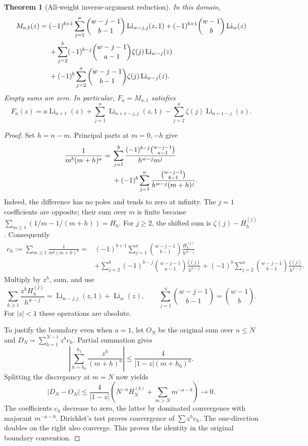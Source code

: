 \documentclass[11pt]{article}
\newtheorem{theorem}{Theorem}[section]
\theoremstyle{definition}
\theoremstyle{remark}
\newcommand{\Li}{\operatorname{Li}}
\begin{document}
\begin{theorem}[All-weight inverse-argument reduction]\label{thm:mixed}
In this domain,
\begin{align}
M_{a,b}(z)
={}&(-1)^{b+1}\sum_{j=1}^{a}
 \binom{w-j-1}{b-1}\Li_{w-j,j}(z,1)
 +(-1)^{b+1}\binom{w-1}{b}\Li_w(z)\notag\\
&+\sum_{j=2}^{b}(-1)^{b-j}
 \binom{w-j-1}{a-1}\zeta(j)\Li_{w-j}(z)\notag\\
&+(-1)^b\sum_{j=2}^{a}
 \binom{w-j-1}{b-1}\zeta(j)\Li_{w-j}(z).
\label{eq:mixedgeneral}
\end{align}
Empty sums are zero. In particular, \(F_a=M_{a,1}\) satisfies
\begin{equation}
F_a(z)=a\Li_{a+1}(z)+\sum_{j=1}^{a}\Li_{a+1-j,j}(z,1)
       -\sum_{j=2}^{a}\zeta(j)\Li_{a+1-j}(z).
\label{eq:mixedb1}
\end{equation}
\end{theorem}

\begin{proof}
Set \(h=n-m\). Principal parts at \(m=0,-h\) give
\begin{align}
\frac1{m^b(m+h)^a}
={}&\sum_{j=1}^{b}
 \frac{(-1)^{b-j}\binom{w-j-1}{a-1}}{h^{w-j}m^j}\notag\\
&+(-1)^b\sum_{j=1}^{a}
 \frac{\binom{w-j-1}{b-1}}{h^{w-j}(m+h)^j}.
\label{eq:partialfraction}
\end{align}
Indeed, the difference has no poles and tends to zero at infinity.
The \(j=1\) coefficients are opposite; their sum over \(m\) is finite
because \(\sum_{m\ge1}(1/m-1/(m+h))=H_h\).
For \(j\ge2\), the shifted sum is \(\zeta(j)-H_h^{(j)}\).
Consequently
\begin{align*}
c_h:=\sum_{m\ge1}\frac1{m^b(m+h)^a}
={}&(-1)^{b+1}\sum_{j=1}^{a}
 \binom{w-j-1}{b-1}\frac{H_h^{(j)}}{h^{w-j}}\\
&+\sum_{j=2}^{b}(-1)^{b-j}\binom{w-j-1}{a-1}
   \frac{\zeta(j)}{h^{w-j}}
 +(-1)^b\sum_{j=2}^{a}\binom{w-j-1}{b-1}
   \frac{\zeta(j)}{h^{w-j}}.
\end{align*}
Multiply by \(z^h\), sum, and use
\[
\sum_{h\ge1}\frac{z^h H_h^{(j)}}{h^{w-j}}
=\Li_{w-j,j}(z,1)+\Li_w(z),\qquad
\sum_{j=1}^{a}\binom{w-j-1}{b-1}=\binom{w-1}{b}.
\]
For \(|z|<1\) these operations are absolute.

To justify the boundary even when \(a=1\), let \(O_N\) be the original
sum over \(n\le N\) and \(D_N=\sum_{h=1}^{N-1}z^h c_h\).
Partial summation gives
\[
\left|\sum_{h=h_0}^{h_1}\frac{z^h}{(m+h)^a}\right|
\le \frac{4}{|1-z|(m+h_0)^a}.
\]
Splitting the discrepancy at \(m=N\) now yields
\[
|D_N-O_N|
\le\frac4{|1-z|}
\left(N^{-a}H_N^{(b)}+\sum_{m>N}m^{-a-b}\right)\longrightarrow0.
\]
The coefficients \(c_h\) decrease to zero, the latter by dominated
convergence with majorant \(m^{-a-b}\).
Dirichlet's test proves convergence of \(\sum z^h c_h\).
The one-direction doubles on the right also converge. This proves the
identity in the original boundary convention.
\end{proof}
\end{document}
